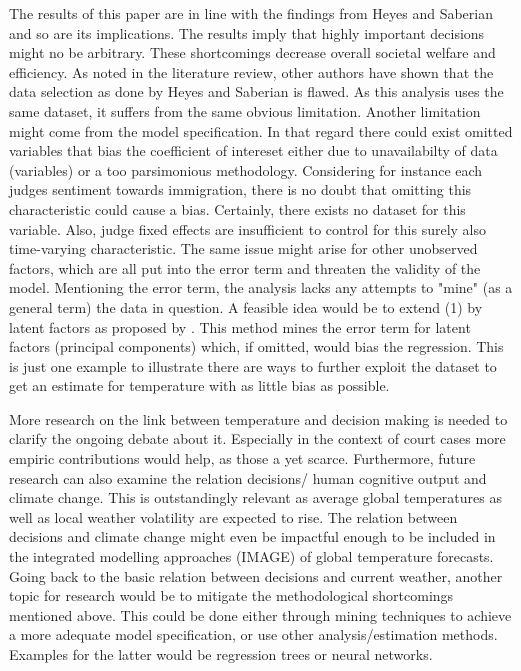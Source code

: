 \documentclass[11pt]{article}
\begin{document}
The results of this paper are in line with the findings from Heyes and Saberian and so are its implications. The results imply that highly important decisions might no be arbitrary. These shortcomings decrease overall societal welfare and efficiency. 
As noted in the literature review, other authors have shown that the data selection as done by Heyes and Saberian is flawed. As this analysis uses the same dataset, it suffers from the same obvious limitation. Another limitation might come from the model specification. In that regard there could exist omitted variables that bias the coefficient of intereset either due to unavailabilty of data (variables) or a too parsimonious methodology. Considering for instance each judges sentiment towards immigration, there is no doubt that omitting this characteristic could cause a bias. Certainly, there exists no dataset for this variable. Also, judge fixed effects are insufficient to control for this surely also time-varying characteristic. The same issue might arise for other unobserved factors, which are all put into the error term and threaten the validity of the model. Mentioning the error term, the analysis lacks any attempts to "mine" (as a general term) the data in question. A feasible idea would be to extend (1) by latent factors as proposed by \cite{bai2009panel}. This method mines the error term for latent factors (principal components) which, if omitted, would bias the regression. This is just one example to illustrate there are ways to further exploit the dataset to get an estimate for temperature with as little bias as possible. 

More research on the link between temperature and decision making is needed to clarify the ongoing debate about it. Especially in the context of court cases more empiric contributions would help, as those a yet scarce. Furthermore, future research can also examine the relation decisions/ human cognitive output and climate change. This is outstandingly relevant as average global temperatures as well as local weather volatility are expected to rise. The relation between decisions and climate change might even be impactful enough to be included in the integrated modelling approaches (IMAGE) of global temperature forecasts. Going back to the basic relation between decisions and current weather, another topic for research would be to mitigate the methodological shortcomings mentioned above. This could be done either through mining techniques to achieve a more adequate model specification, or use other analysis/estimation methods. Examples for the latter would be regression trees or neural networks.
\end{document}
